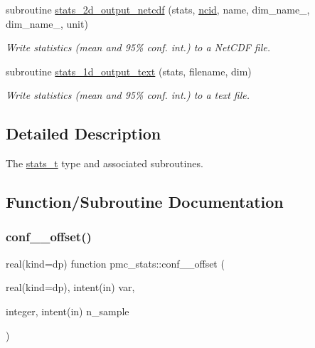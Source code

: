 \begin{DoxyCompactItemize}
subroutine \mbox{\hyperlink{namespacepmc__stats_ad17733f0597dca5b088f1f4b6d99ded8}{stats\+\_\+2d\+\_\+output\+\_\+netcdf}} (stats, \mbox{\hyperlink{fractal_8_f90_a4e89f3f850921ff84a6dfce8b166ad50}{ncid}}, name, dim\+\_\+name\+\_, dim\+\_\+name\+\_, unit)
\begin{DoxyCompactList}\small\item\em Write statistics (mean and 95\% conf. int.) to a Net\+C\+DF file. \end{DoxyCompactList}\item 
subroutine \mbox{\hyperlink{namespacepmc__stats_a64f09d5c5d2f28d8e7351b5cc14a9848}{stats\+\_\+1d\+\_\+output\+\_\+text}} (stats, filename, dim)
\begin{DoxyCompactList}\small\item\em Write statistics (mean and 95\% conf. int.) to a text file. \end{DoxyCompactList}\end{DoxyCompactItemize}


\subsection{Detailed Description}
The {\ttfamily \mbox{\hyperlink{structpmc__stats_1_1stats__t}{stats\+\_\+t}}} type and associated subroutines. 

\subsection{Function/\+Subroutine Documentation}
\mbox{\label{namespacepmc__stats_a4ef20f4ac022e62933d3ed80e4041b88}} 
\subsubsection{\texorpdfstring{conf\+\_\+\_\+offset()}{conf\_95\_offset()}}
{\footnotesize\ttfamily real(kind=dp) function pmc\+\_\+stats\+::conf\+\_\+\_\+offset (\begin{DoxyParamCaption}\item[{real(kind=dp), intent(in)}]{var,  }\item[{integer, intent(in)}]{n\+\_\+sample }\end{DoxyParamCaption})}



